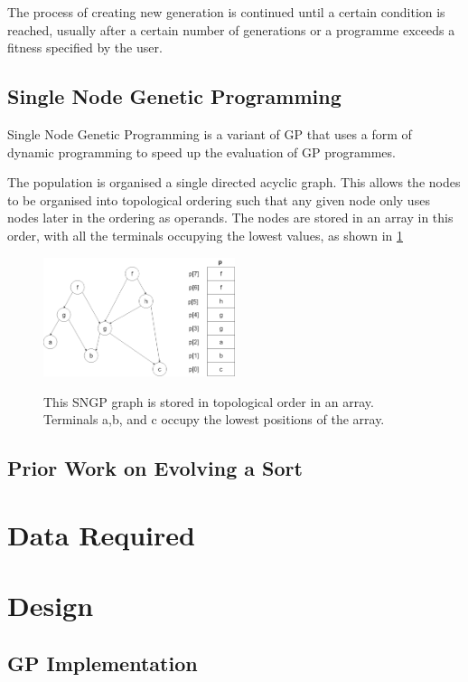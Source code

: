 \documentclass{article}
\begin{document}
			The process of creating new generation is continued until a certain condition is reached, usually after a certain number of generations or a programme exceeds a fitness specified by the user.
			
		\subsection{Single Node Genetic Programming}
		
			Single Node Genetic Programming is a variant of GP that uses a form of dynamic programming to speed up the evaluation of GP programmes.
			
			The population is organised a single directed acyclic graph. This allows the nodes to be organised into topological ordering such that any given node only uses nodes later in the ordering as operands. The nodes are stored in an array in this order, with all the terminals occupying the lowest values, as shown in \ref{fig:sngp_graph}
			
			\begin{figure}
				\centering
				\includegraphics[width=0.5\textwidth]{8_sngp_graph}
				\label{fig:sngp_graph}
				\caption{This SNGP graph is stored in topological order in an array. Terminals a,b, and c occupy the lowest positions of the array.}
			\end{figure}
		 
		\subsection{Prior Work on Evolving a Sort}
	
	\section{Data Required}
	
	\section{Design}
	
		\subsection{GP Implementation}
		
\end{document}
